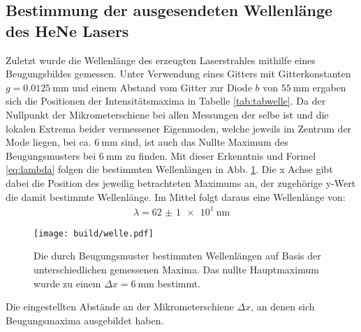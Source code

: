\subsection{Bestimmung der ausgesendeten Wellenlänge des HeNe Lasers}
Zuletzt wurde die Wellenlänge des erzeugten Laserstrahles mithilfe eines Beugungsbildes gemessen. Unter Verwendung eines Gitters mit Gitterkonstanten $g = \SI{0.0125}{\milli\meter}$ und einem Abstand vom Gitter zur Diode $b$ von $\SI{55}{\milli\meter}$ ergaben sich die Positionen der Intensitätsmaxima in Tabelle \ref{tab:tabwelle}. Da der Nullpunkt der Mikrometerschiene bei allen Messungen der selbe ist und die lokalen Extrema beider vermessener Eigenmoden, welche jeweils im Zentrum der Mode liegen, bei ca. $\SI{6}{\milli\meter}$ sind, ist auch das Nullte Maximum des Beugungsmusters bei $\SI{6}{\milli\meter}$ zu finden. Mit dieser Erkenntnis und Formel \eqref{eq:lambda} folgen die bestimmten Wellenlängen in Abb. \ref{fig:welle}. Die x Achse gibt dabei die Position des jeweilig betrachteten Maximums an, der zugehörige y-Wert die damit bestimmte Wellenlänge. Im Mittel folgt daraus eine Wellenlänge von: 
\begin{gather*}
	\lambda = \SI{62(1)e1}{\nano\meter}
	\end{gather*}







	



\begin{figure}
	\centering
	\texttt{[image: build/welle.pdf]}
	\caption{Die durch Beugungsmuster bestimmten Wellenlängen auf Basis der unterschiedlichen gemessenen Maxima. Das nullte Hauptmaximum wurde zu einem $\Delta x = \SI{6}{\milli\meter}$ bestimmt.}
	\label{fig:welle}
\end{figure}


\begin{table}
	\centering
	\caption{Die eingestellten Abstände an der Mikrometerschiene $\varDelta x$, an denen sich Beugungsmaxima ausgebildet haben.}
	
	\label{tab:tabwelle}
\end{table}
